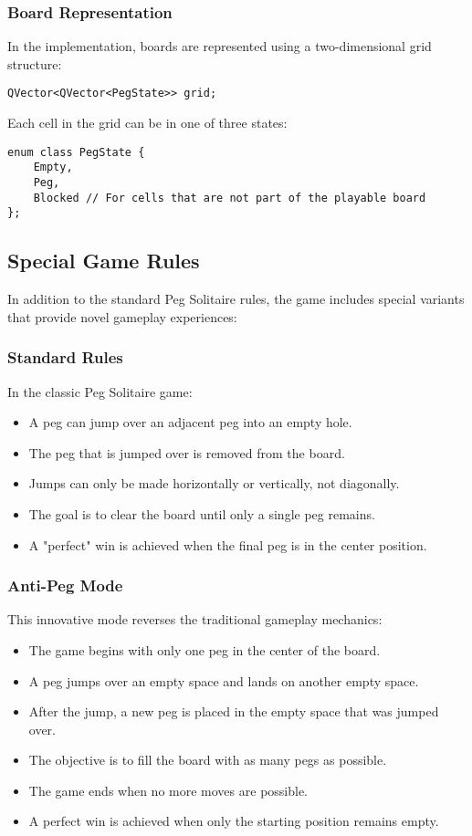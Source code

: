 \subsubsection{Board Representation}
In the implementation, boards are represented using a two-dimensional grid structure:
\begin{verbatim}
QVector<QVector<PegState>> grid;
\end{verbatim}

Each cell in the grid can be in one of three states:
\begin{verbatim}
enum class PegState {
    Empty,
    Peg,
    Blocked // For cells that are not part of the playable board
};
\end{verbatim}

\subsection{Special Game Rules}
In addition to the standard Peg Solitaire rules, the game includes special variants that provide novel gameplay experiences:

\subsubsection{Standard Rules}
In the classic Peg Solitaire game:
\begin{itemize}
    \item A peg can jump over an adjacent peg into an empty hole.
    \item The peg that is jumped over is removed from the board.
    \item Jumps can only be made horizontally or vertically, not diagonally.
    \item The goal is to clear the board until only a single peg remains.
    \item A "perfect" win is achieved when the final peg is in the center position.
\end{itemize}

\subsubsection{Anti-Peg Mode}
This innovative mode reverses the traditional gameplay mechanics:
\begin{itemize}
    \item The game begins with only one peg in the center of the board.
    \item A peg jumps over an empty space and lands on another empty space.
    \item After the jump, a new peg is placed in the empty space that was jumped over.
    \item The objective is to fill the board with as many pegs as possible.
    \item The game ends when no more moves are possible.
    \item A perfect win is achieved when only the starting position remains empty.
\end{itemize}

